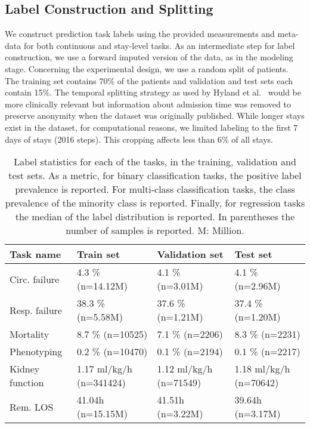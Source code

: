 \documentclass{article}
\begin{document}
\subsection{Label Construction and Splitting}
 We construct prediction task labels using the provided measurements and meta-data for both continuous and stay-level tasks. As an intermediate step for label construction, we use a forward imputed version of the data, as in the modeling stage. Concerning the experimental design, we use a random split of patients. The training set contains 70\% of the patients and validation and test sets each contain 15\%. The temporal splitting strategy as used by Hyland et al.~\citep{hyland2020early} would be more clinically relevant but information about admission time was removed to preserve anonymity when the dataset was originally published. While longer stays exist in the dataset, for computational reasons, we limited labeling to the first 7 days of stays (2016 steps). This cropping affects less than 6\% of all stays.

 
\begin{table}[ht!]
\footnotesize
\caption{Label statistics for each of the tasks, in the training, validation and test sets. As a metric, for binary classification tasks, the positive label prevalence is reported. For multi-class classification tasks, the class prevalence of the minority class is reported. Finally, for regression tasks the median of the label 
distribution is reported. In parentheses the number
of samples is reported. M: Million.}
\begin{center}
\begin{tabular}{llll}
\toprule
\textbf{Task name} & \textbf{Train set} & 
\textbf{Validation set} & \textbf{Test set} \\
\midrule
Circ. failure & 4.3 \% (n=14.12M) & 4.1 \% (n=3.01M) & 4.1 \% (n=2.96M) \\
Resp. failure & 38.3 \% (n=5.58M) & 37.6 \% (n=1.21M) & 37.4 \% (n=1.20M) \\
\midrule
Mortality & 8.7 \% (n=10525) & 7.1 \% (n=2206) & 8.3 \% (n=2231) \\
Phenotyping & 0.2 \% (n=10470) & 0.1 \% (n=2194) & 0.1 \% (n=2217) \\
\midrule
Kidney function & 1.17 ml/kg/h (n=341424) & 1.12 ml/kg/h (n=71549) & 1.18 ml/kg/h (n=70642) \\
Rem. LOS & 41.04h (n=15.15M) & 41.51h (n=3.22M) & 39.64h (n=3.17M) \\
\bottomrule
\end{tabular}\end{center}
\label{tab:label-stats-per-split}
\end{table}
\end{document}
